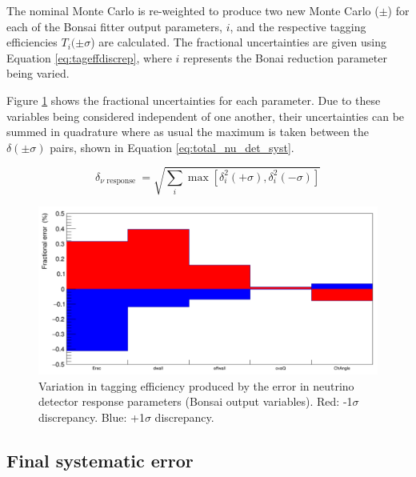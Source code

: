 The nominal Monte Carlo is re-weighted to produce two new Monte Carlo ($\pm$) for each of the Bonsai fitter output parameters, $i$, and the respective tagging efficiencies $T_{i}(\pm\sigma$) are calculated. The fractional uncertainties are given using Equation \ref{eq:tageffdiscrep}, where $i$ represents the Bonai reduction parameter being varied.



Figure \ref{fig:nu_det_syst_error} shows the fractional uncertainties for each parameter. Due to these variables being considered independent of one another, their uncertainties can be summed in quadrature where as usual the maximum is taken between the $\delta(\pm\sigma)$ pairs, shown in Equation \ref{eq:total_nu_det_syst}.

\begin{equation}
    \delta_{\text {$\nu$ response }}=\sqrt{\sum_i \max \left[\delta_i^2(+\sigma), \delta_i^2(-\sigma)\right]}
\label{eq:total_nu_det_syst}
\end{equation}

\begin{figure}[!htb]
    \centering
    \includegraphics[width=\textwidth]{Figures/nu_det_response.png}
    \caption{Variation in tagging efficiency produced by the error in neutrino detector response parameters (Bonsai output variables). Red: -1$\sigma$ discrepancy. Blue: +1$\sigma$ discrepancy. }
    \label{fig:nu_det_syst_error}
\end{figure}

\newpage


\subsection{Final systematic error}


